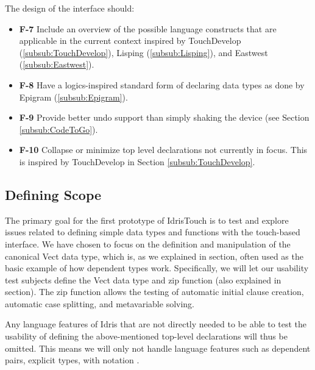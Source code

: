 The design of the interface should:

\begin{itemize}     
	\item \textbf{F-7} Include an overview of the possible language constructs that are
	applicable in the current context inspired by TouchDevelop (\ref{subsub:TouchDevelop}), Lisping
	(\ref{subsub:Lisping}), and Eastwest (\ref{subsub:Eastwest}).
	\item \textbf{F-8} Have a logics-inspired standard form of declaring data types as done by Epigram
	(\ref{subsub:Epigram}).
	\item \textbf{F-9} Provide better undo support than simply shaking the device (see Section
	\ref{subsub:CodeToGo}).
	\item \textbf{F-10} Collapse or minimize top level declarations not currently in focus. This is inspired by TouchDevelop
	in Section \ref{subsub:TouchDevelop}.
\end{itemize}


\subsection{Defining Scope} 
The primary goal for the first prototype of IdrisTouch is to test and explore
issues related to defining simple data types and functions with the touch-based interface. 
We have chosen to focus on the definition and manipulation of the canonical Vect data type, which is, as we explained in
section, often used as the basic example of how dependent types
work. Specifically, we will let our usability test subjects define the Vect data type and zip
function (also explained in section). The zip function allows the
testing of automatic initial clause creation, automatic case splitting, and metavariable solving.

Any language features of Idris that are not directly needed to be able to test
the usability of defining the above-mentioned top-level declarations will thus
be omitted. This means we will only not handle language features such as
dependent pairs, explicit types, with notation .




